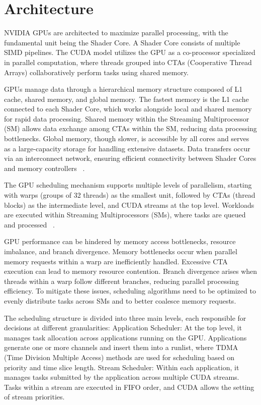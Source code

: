 \section{Architecture}

NVIDIA GPUs are architected to maximize parallel processing, with the fundamental unit being the Shader Core. A Shader Core consists of multiple SIMD pipelines. The CUDA model utilizes the GPU as a co-processor specialized in parallel computation, where threads grouped into CTAs (Cooperative Thread Arrays) collaboratively perform tasks using shared memory.

GPUs manage data through a hierarchical memory structure composed of L1 cache, shared memory, and global memory. The fastest memory is the L1 cache connected to each Shader Core, which works alongside local and shared memory for rapid data processing. Shared memory within the Streaming Multiprocessor (SM) allows data exchange among CTAs within the SM, reducing data processing bottlenecks. Global memory, though slower, is accessible by all cores and serves as a large-capacity storage for handling extensive datasets. Data transfers occur via an interconnect network, ensuring efficient connectivity between Shader Cores and memory controllers ~\cite{Bakhoda2009}.

The GPU scheduling mechanism supports multiple levels of parallelism, starting with warps (groups of 32 threads) as the smallest unit, followed by CTAs (thread blocks) as the intermediate level, and CUDA streams at the top level. Workloads are executed within Streaming Multiprocessors (SMs), where tasks are queued and processed ~\cite{Sanudo2020}.

GPU performance can be hindered by memory access bottlenecks, resource imbalance, and branch divergence. Memory bottlenecks occur when parallel memory requests within a warp are inefficiently handled. Excessive CTA execution can lead to memory resource contention. Branch divergence arises when threads within a warp follow different branches, reducing parallel processing efficiency. To mitigate these issues, scheduling algorithms need to be optimized to evenly distribute tasks across SMs and to better coalesce memory requests.

The scheduling structure is divided into three main levels, each responsible for decisions at different granularities:
Application Scheduler: At the top level, it manages task allocation across applications running on the GPU. Applications generate one or more channels and insert them into a runlist, where TDMA (Time Division Multiple Access) methods are used for scheduling based on priority and time slice length.
Stream Scheduler: Within each application, it manages tasks submitted by the application across multiple CUDA streams. Tasks within a stream are executed in FIFO order, and CUDA allows the setting of stream priorities.

